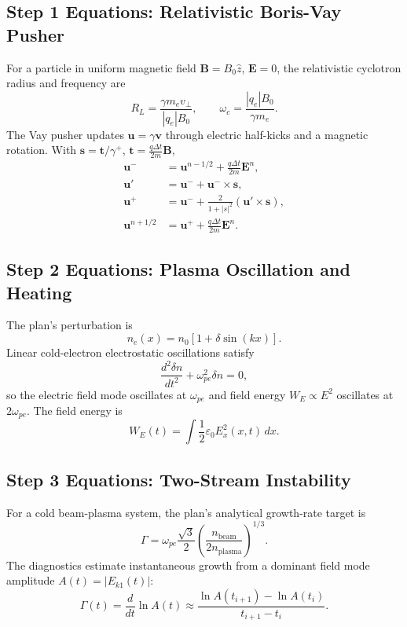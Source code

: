 \documentclass[11pt,a4paper]{article}
\begin{document}
\subsection{Step 1 Equations: Relativistic Boris-Vay Pusher}
For a particle in uniform magnetic field $\mathbf{B}=B_0\hat z$, $\mathbf{E}=0$, the relativistic cyclotron radius and frequency are
\begin{equation}
R_L=\frac{\gamma m_e v_\perp}{|q_e|B_0},\qquad
\omega_c=\frac{|q_e|B_0}{\gamma m_e}.
\end{equation}
The Vay pusher updates $\mathbf{u}=\gamma\mathbf{v}$ through electric half-kicks and a magnetic rotation. With $\mathbf{s}=\mathbf{t}/\gamma^+$, $\mathbf{t}=\frac{q\Delta t}{2m}\mathbf{B}$,
\begin{align}
\mathbf{u}^- &= \mathbf{u}^{n-1/2}+\frac{q\Delta t}{2m}\mathbf{E}^n,\\
\mathbf{u}' &= \mathbf{u}^-+\mathbf{u}^-\times\mathbf{s},\\
\mathbf{u}^+ &= \mathbf{u}^-+\frac{2}{1+|s|^2}(\mathbf{u}'\times\mathbf{s}),\\
\mathbf{u}^{n+1/2} &= \mathbf{u}^+ + \frac{q\Delta t}{2m}\mathbf{E}^n.
\end{align}

\subsection{Step 2 Equations: Plasma Oscillation and Heating}
The plan's perturbation is
\begin{equation}
n_e(x)=n_0\left[1+\delta\sin(kx)\right].
\end{equation}
Linear cold-electron electrostatic oscillations satisfy
\begin{equation}
\frac{d^2 \delta n}{dt^2}+\omega_{pe}^2\delta n=0,
\end{equation}
so the electric field mode oscillates at $\omega_{pe}$ and field energy $W_E\propto E^2$ oscillates at $2\omega_{pe}$. The field energy is
\begin{equation}
W_E(t)=\int \frac{1}{2}\varepsilon_0 E_x^2(x,t)\,dx.
\end{equation}

\subsection{Step 3 Equations: Two-Stream Instability}
For a cold beam-plasma system, the plan's analytical growth-rate target is
\begin{equation}
\Gamma = \omega_{pe}\frac{\sqrt{3}}{2}\left(\frac{n_{\mathrm{beam}}}{2n_{\mathrm{plasma}}}\right)^{1/3}.
\end{equation}
The diagnostics estimate instantaneous growth from a dominant field mode amplitude $A(t)=|E_{k1}(t)|$:
\begin{equation}
\Gamma(t)=\frac{d}{dt}\ln A(t)\approx \frac{\ln A(t_{i+1})-\ln A(t_i)}{t_{i+1}-t_i}.
\end{equation}
\end{document}
